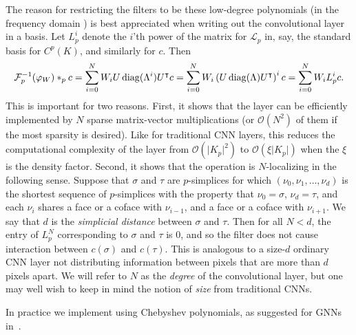 The reason for restricting the filters to be these low-degree polynomials (in the frequency domain ) is best appreciated when writing out the convolutional layer in a basis. Let $L^i_p$ denote the $i$'th power of the matrix for $\mathcal{L}_p$ in, say, the standard basis for $C^p(K)$, and similarly for $c$. Then
\begin{equation}
  \mathcal{F}^{-1}_p(\varphi_W)\ast_p c = \sum_{i=0}^N W_iU\operatorname{diag}(\Lambda^i)U^{\intercal} c = \sum_{i=0}^N W_i\left(U\operatorname{diag}(\Lambda)U^{\intercal}\right)^i c = \sum_{i=0}^NW_iL^i_pc. \label{eq:filter}
\end{equation}
This is important for two reasons. First, it shows that the layer can be efficiently implemented by $N$ sparse matrix-vector multiplications (or $\mathcal{O}(N^2)$ of them if the most sparsity is desired). Like for traditional CNN layers, this reduces the computational complexity of the layer from $\mathcal{O}(\lvert K_p\rvert^2)$ to $\mathcal{O}(\xi\lvert K_p\rvert)$ when the $\xi$ is the density factor. Second, it shows that the operation is $N$-localizing in the following sense.
Suppose that $\sigma$ and $\tau$ are $p$-simplices for which $(\nu_0, \nu_1, \dotsc, \nu_d)$ is the shortest sequence of $p$-simplices with the property that $\nu_0=\sigma$, $\nu_d=\tau$, and each $\nu_i$ shares a face or a coface with $\nu_{i-1}$, and a face or a coface with $\nu_{i+1}$. We say that $d$ is the \emph{simplicial distance} between $\sigma$ and $\tau$. Then for all $N<d$, the entry of $L_p^N$ corresponding to $\sigma$ and $\tau$ is $0$, and so the filter does not cause interaction between $c(\sigma)$ and $c(\tau)$. This is analogous to a size-$d$ ordinary CNN layer not distributing information between pixels that are more than $d$ pixels apart. We will refer to $N$ as the \emph{degree} of the convolutional layer, but one may well wish to keep in mind the notion of \emph{size} from traditional CNNs.

In practice we implement  using Chebyshev polynomials, as suggested for GNNs in~\cite{defferrard2016convolutional}.

